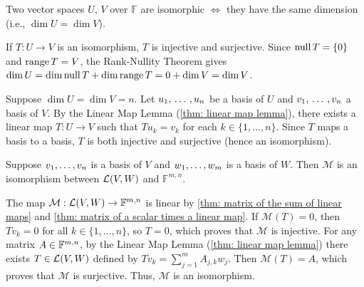   \begin{thm}
    \label{thm: dimension shows whether vector spaces are isomorphic}
    Two \fd vector spaces $U$, $V$ over $\mathbb{F}$ are isomorphic $\iff$ they have the same dimension (i.e., $\dim U = \dim V$).
  \end{thm}
  \begin{prf}
    \Rightarrowdirection If $T: U \to V$ is an isomorphism, $T$ is injective and surjective. Since $\operatorname{null} T = \{0\}$ and $\operatorname{range} T = V$, the Rank-Nullity Theorem gives $\dim U = \dim \operatorname{null} T + \dim \operatorname{range} T = 0 + \dim V = \dim V$.

    \Leftarrowdirection Suppose $\dim U = \dim V = n$. Let $u_1, {\, \ldots \,\,}, u_n$ be a basis of $U$ and $v_1, {\, \ldots \,\,}, v_n$ a basis of $V$. By the Linear Map Lemma (\ref{thm: linear map lemma}), there exists a linear map $T: U \to V$ such that $Tu_k = v_k$ for each $k \in \{1, \dots, n\}$. Since $T$ maps a basis to a basis, $T$ is both injective and surjective (hence an isomorphism).
  \end{prf}


  \begin{thm} 
    \label{thm: the space of linear maps and the space of all matrices are isomorphic}
    Suppose $v_1, \dots, v_n$ is a basis of $V$ and $w_1, \dots, w_m$ is a basis of $W$. Then $\mathcal{M}$ is an isomorphism between ${\mathcal{L}(V,W)}$ and $\mathbb{F}^{m,n}$.
  \end{thm}
  \begin{prf}
    The map $\mathcal{M}: \mathcal{L}(V,W) \to \mathbb{F}^{m,n}$ is linear by \ref{thm: matrix of the sum of linear maps} and \ref{thm: matrix of a scalar times a linear map}.
    If $\mathcal{M}(T) = 0$, then $Tv_k = 0$ for all $k \in \{1, \dots, n\}$, so $T = 0$, which proves that $\mathcal{M}$ is injective.
    For any matrix $A \in \mathbb{F}^{m,n}$, by the Linear Map Lemma (\ref{thm: linear map lemma}) there exists $T \in \mathcal{L}(V,W)$ defined by $Tv_k = \sum_{j=1}^m A_{j,k} w_j$. Then $\mathcal{M}(T) = A$, which proves that $\mathcal{M}$ is surjective.
    Thus, $\mathcal{M}$ is an isomorphism.
  \end{prf}

